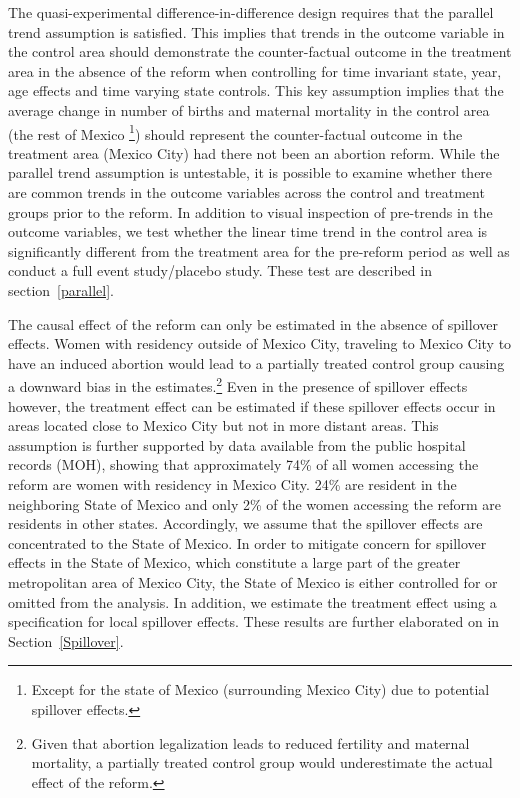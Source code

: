 \documentclass[a4paper, 11pt]{article}
\begin{document}
\begin{spacing}{2}
The quasi-experimental difference-in-difference design requires that the parallel trend assumption is satisfied. This implies that trends in the outcome variable in the control area should demonstrate the counter-factual outcome in the treatment area in the absence of the reform when controlling for time invariant state, year, age effects and time varying state controls. This key assumption implies that the average change in number of births and maternal mortality in the control area (the rest of Mexico \footnote{Except for the state of Mexico (surrounding Mexico City) due to potential spillover effects.}) should represent the counter-factual outcome in the treatment area (Mexico City) had there not been an abortion reform. While the parallel trend assumption is untestable, it is possible to examine whether there are common trends in the outcome variables across the control and treatment groups prior to the reform. In addition to visual inspection of pre-trends in the outcome variables, we test whether the linear time trend in the control area is significantly different from the treatment area for the pre-reform period as well as conduct a full event study/placebo study. These test are described in section~\ref{parallel}.  

The causal effect of the reform can only be estimated in the absence of spillover effects. Women with residency outside of Mexico City, traveling to Mexico City to have an induced abortion would lead to a partially treated control group causing a downward bias in the estimates.\footnote{Given that abortion legalization leads to reduced fertility and maternal mortality, a partially treated control group would underestimate the actual effect of the reform.} Even in the presence of spillover effects however, the treatment effect can be estimated if these spillover effects occur in areas located close to Mexico City but not in more distant areas. This assumption is further supported by data available from the public hospital records (MOH), showing that approximately 74\% of all women accessing the reform are women with residency in Mexico City. 24\% are resident in the neighboring State of Mexico and only 2\% of the women accessing the reform are residents in other states. Accordingly, we assume that the spillover effects are concentrated to the State of Mexico. In order to mitigate concern for spillover effects in the State of Mexico, which constitute a large part of the greater metropolitan area of Mexico City, the State of Mexico is either controlled for or omitted from the analysis. In addition, we estimate the treatment effect using a specification for local spillover effects. These results are further elaborated on in Section~\ref{Spillover}.   


\end{spacing}
\end{document}
